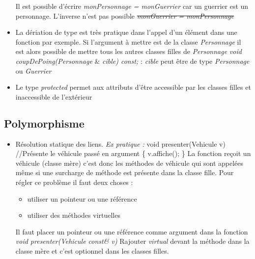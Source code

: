 \documentclass[12pt,a4paper]{article}
\begin{document}
\begin{itemize}
\newline Il est possible d'écrire \textit{monPersonnage = monGuerrier} car un guerrier est un personnage. L'inverse n'est pas possible \sout{\textit{monGuerrier = monPersonnage}}
\item La dériation de type est très pratique dans l'appel d'un élément dans une fonction par exemple. Si l'argument à mettre est de la classe \textit{Personnage} il est alors possible de mettre tous les autres classes filles de \textit{Personnage}
\newline \textit{void coupDePoing(Personnage} \& \textit{cible) const;} : \textit{cible} peut être de type \textit{Personnage} ou \textit{Guerrier}
\item Le type \textit{protected} permet aux attributs d'être accessible par les classes filles et inaccessible de l'extérieur
\end{itemize}

\subsection{Polymorphisme}
\begin{itemize}
\item Résolution statique des liens. \textit{Ex pratique : } 
\newline void presenter(Vehicule v)  //Présente le véhicule passé en argument
\newline \{  v.affiche(); \}
\newline La fonction reçoit un véhicule (classe mère) c’est donc les méthodes de véhicule qui sont appelées même si une surcharge de méthode est présente dans la classe fille.
Pour régler ce problème il faut deux choses :
\begin{itemize}
\item utiliser un pointeur ou une référence
\item utiliser des méthodes virtuelles
\end{itemize}
Il faut placer un pointeur ou une référence comme argument dans la fonction \textit{void presenter(Vehicule const\& v)}
\newline Rajouter \textit{virtual} devant la méthode dans la classe mère et c’est optionnel dans les classes filles.
\end{itemize}
\end{document}
